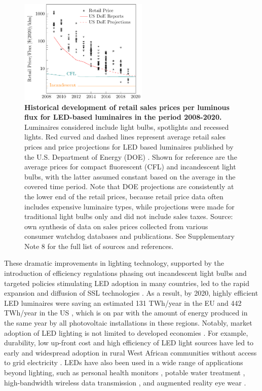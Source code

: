 \documentclass[parskip=full]{article}
\begin{document}
\begin{figure}[h!]
\centering
  \includegraphics[height=5cm]{figures/cost_lamp_small.pdf}
  \caption{\textbf{Historical development of retail sales prices per luminous flux for LED-based luminaires in the period 2008-2020.} Luminaires considered include light bulbs, spotlights and recessed lights. Red curved and dashed lines represent average retail sales prices and price projections for LED based luminaires published by the U.S. Department of Energy (DOE) \cite{national2013assessment}. Shown for reference are the average prices for compact fluorescent (CFL) and incandescent light bulbs, with the latter assumed constant based on the average in the covered time period. Note that DOE projections are consistently at the lower end of the retail prices, because retail price data often includes expensive luminaire types, while projections were made for traditional light bulbs only and did not include sales taxes. Source: own synthesis of data on sales prices collected from various consumer watchdog databases and publications. See Supplementary Note 8 for the full list of sources and references.}
  \label{fgr:cost_lamp_small}
\end{figure}

These dramatic improvements in lighting technology, supported by the introduction of efficiency regulations phasing out incandescent light bulbs and targeted policies stimulating LED adoption in many countries, led to the rapid expansion and diffusion of SSL technologies \cite{weinold2020long, stegmaier2021incandescent, Mills2014}. As a result, by 2020, highly efficient LED luminaires were saving an estimated 131 TWh/year in the EU \cite{eu2019impactass} and 442 TWh/year in the US \cite{guidehouse2020adoption}, which is on par with the amount of energy produced in the same year by all photovoltaic installations in these regions. Notably, market adoption of LED lighting is not limited to developed economies \cite{Kamat2020}. For example, durability, low up-front cost and high efficiency of LED light sources have led to early and widespread adoption in rural West African communities without access to grid electricity \cite{Bensch2017}. LEDs have also been used in a wide range of applications beyond lighting, such as personal health monitors \cite{Wyatt2020}, potable water treatment \cite{Lui2014}, high-bandwidth wireless data transmission \cite{Haas2016}, and augmented reality eye wear \cite{Lee2016}. 
\end{document}

